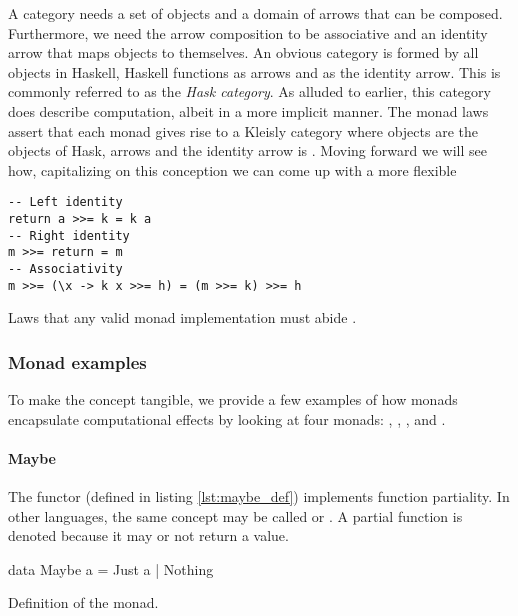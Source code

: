   A category needs a set of objects and a domain of arrows that can be
  composed. Furthermore, we need the arrow composition to be associative
  and an identity arrow that maps objects to themselves. An obvious
  category is formed by all objects in Haskell, Haskell functions as
  arrows and  as the identity arrow. This is
  commonly referred to as the \emph{Hask category}. As alluded to earlier,
  this category does describe computation, albeit in a more implicit
  manner. The monad laws assert that each monad gives rise to a
  Kleisly category where objects are the objects of Hask, arrows
   and the identity arrow is .
  Moving forward we will see how, capitalizing on this conception we
  can come up with a more flexible

\begin{code}
\begin{verbatim}
-- Left identity
return a >>= k = k a
-- Right identity
m >>= return = m
-- Associativity
m >>= (\x -> k x >>= h) = (m >>= k) >>= h
\end{verbatim}
    \caption{\label{lst:monad_laws}Laws that any valid monad
      implementation must abide \cite{yorgeyTypeclassopedia2009}.}
  \end{code}


  \subsubsection{Monad examples}

  To make the concept tangible, we provide a few examples of how monads
  encapsulate computational effects by looking at four monads: ,
   , , and .

  \paragraph{Maybe}

  The  functor (defined in listing \ref{lst:maybe_def})
  implements function partiality. In other languages, the same concept may be
  called  or . A partial function is denoted
   because it may or not return a
  value.

  \begin{code}
\begin{haskellcode}
data Maybe a = Just a | Nothing
\end{haskellcode}
    \caption{\label{lst:maybe_def}Definition of the  monad.}
  \end{code}

